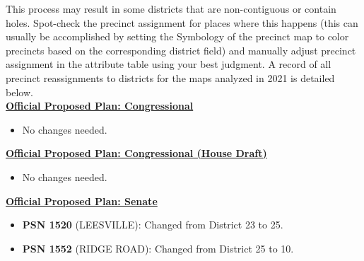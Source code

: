 \documentclass[11pt]{article}
\begin{document}
This process may result in some districts that are non-contiguous or contain holes. Spot-check the precinct assignment for places where this happens (this can usually be accomplished by setting the Symbology of the precinct map to color precincts based on the corresponding district field) and manually adjust precinct assignment in the attribute table using your best judgment. A record of all precinct reassignments to districts for the maps analyzed in 2021 is detailed below.\\

\underline{\textbf{Official Proposed Plan: Congressional}}

\begin{itemize}
	\item No changes needed.
\end{itemize}

\underline{\textbf{Official Proposed Plan: Congressional (House Draft)}}

\begin{itemize}
	\item No changes needed.
\end{itemize}

\underline{\textbf{Official Proposed Plan: Senate}}
\begin{itemize}
	\item \textbf{PSN 1520}  (LEESVILLE): Changed from District 23 to 25.
	\item \textbf{PSN 1552} (RIDGE ROAD): Changed from District 25 to 10.
\end{itemize}
\end{document}
